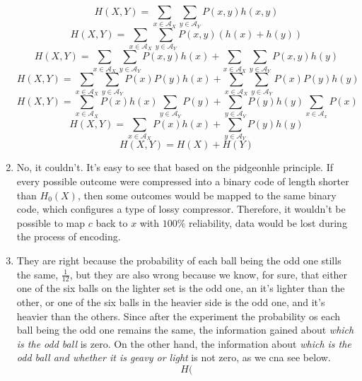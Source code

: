 \documentclass{article}
\begin{document}
\begin{enumerate}
	      \[H(X, Y) = \sum_{x \in \mathcal{A}_X} \sum_{y \in \mathcal{A}_Y} P(x, y)h(x, y)\]
	      \[H(X, Y) = \sum_{x \in \mathcal{A}_X} \sum_{y \in \mathcal{A}_Y} P(x, y)(h(x) + h(y))\]
	      \[H(X, Y) = \sum_{x \in \mathcal{A}_X} \sum_{y \in \mathcal{A}_Y} P(x, y)h(x) + \sum_{x \in \mathcal{A}_X} \sum_{y \in \mathcal{A}_Y} P(x, y)h(y)\]
	      \[H(X, Y) = \sum_{x \in \mathcal{A}_X} \sum_{y \in \mathcal{A}_Y} P(x)P(y)h(x) + \sum_{x \in \mathcal{A}_X} \sum_{y \in \mathcal{A}_Y} P(x)P(y)h(y)\]
	      \[H(X, Y) = \sum_{x \in \mathcal{A}_X} P(x)h(x) \sum_{y \in \mathcal{A}_Y} P(y) + \sum_{y \in \mathcal{A}_Y} P(y)h(y) \sum_{x \in \mathcal{A}_x} P(x)\]
	      \[H(X, Y) = \sum_{x \in \mathcal{A}_X} P(x)h(x) + \sum_{y \in \mathcal{A}_Y} P(y)h(y) \]
	      \[H(X, Y) = H(X) + H(Y)\]

	\item No, it couldn't. It's easy to see that based on the pidgeonhle principle. If every possible outcome were compressed into a binary code of length shorter than \(H_0(X)\), then some outcomes would be mapped to the same binary code, which configures a type of lossy compressor. Therefore, it wouldn't be possible to map \(c\) back to \(x\) with \(100\%\) reliability, data would be lost during the process of encoding.

	\item They are right because the probability of each ball being the odd one stills the same, \(\frac{1}{12}\), but they are also wrong because we know, for sure, that either one of the six balls on the lighter set is the odd one, an it's lighter than the other, or one of the six balls in the heavier side is the odd one, and it's heavier than the others.
	      Since after the experiment the probability os each ball being the odd one remains the same, the information gained about \textit{which is the odd ball} is zero. On the other hand, the information about \textit{which is the odd ball and whether it is geavy or light} is not zero, as we cna see below.
	      \[ H( \]


\end{enumerate}


\end{document}
